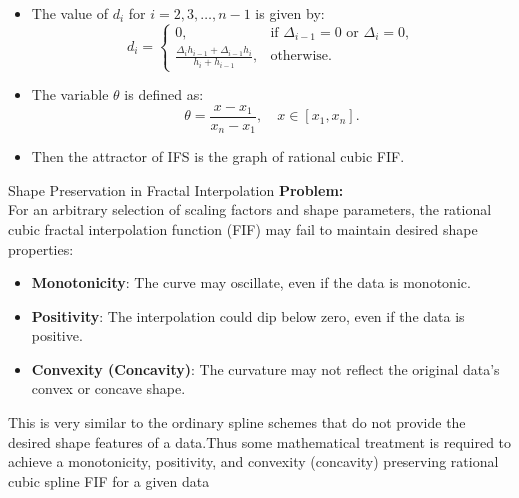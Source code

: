 \documentclass{beamer}
\begin{document}
\begin{frame}{}
    \begin{itemize}
        \item The value of \( d_i \) for \( i = 2, 3, \ldots, n - 1 \) is given by:
        \[
        d_i =
        \begin{cases}
            0, & \text{if } \Delta_{i-1} = 0 \text{ or } \Delta_i = 0, \\
            \frac{\Delta_i h_{i-1} + \Delta_{i-1} h_i}{h_i + h_{i-1}}, & \text{otherwise}.
        \end{cases}
        \]
    \end{itemize}
     \begin{itemize}
        \item The variable \(\theta\) is defined as:
        \[
        \theta = \frac{x - x_1}{x_n - x_1}, \quad x \in [x_1, x_n].
        \]
    \end{itemize}
    \begin{itemize}
        \item Then the attractor of IFS is the graph of rational cubic FIF.

    \end{itemize}
\end{frame}
\begin{frame}{Shape Preservation in Fractal Interpolation}
    \textbf{Problem:} \\
    For an arbitrary selection of scaling factors and shape parameters, the rational cubic fractal interpolation function (FIF) may fail to maintain desired shape properties:
    
    \begin{itemize}
        \item \textbf{Monotonicity}: The curve may oscillate, even if the data is monotonic.
        \item \textbf{Positivity}: The interpolation could dip below zero, even if the data is positive.
        \item \textbf{Convexity (Concavity)}: The curvature may not reflect the original data's convex or concave shape.
    \end{itemize}
    \item This is very similar to the ordinary spline schemes that do not
provide the desired shape features of a data.Thus some
mathematical treatment is required to achieve a monotonicity,
positivity, and convexity (concavity) preserving rational cubic spline
FIF for a given data

    
\end{frame}
\end{document}
